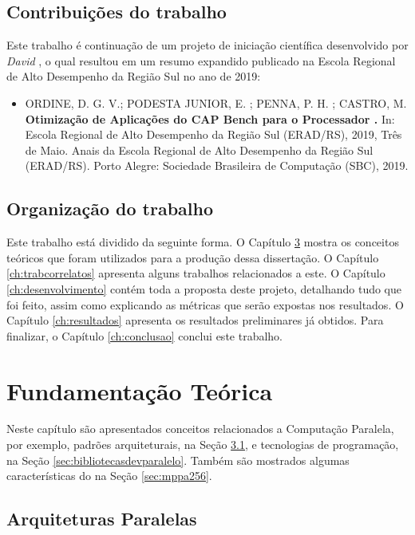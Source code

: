 \section{Contribuições do trabalho}

Este trabalho é continuação de um projeto de iniciação científica desenvolvido por \textit{David} \etal, o qual resultou em um resumo expandido publicado na Escola Regional de Alto Desempenho da Região Sul no ano de 2019:

\begin{itemize}
  \item ORDINE, D. G. V.; PODESTA JUNIOR, E. ; PENNA, P. H. ; CASTRO, M. \textbf{Otimização de Aplicações do CAP Bench para o Processador \mppa.} In: Escola Regional de Alto Desempenho da Região Sul (ERAD/RS), 2019, Três de Maio. Anais da Escola Regional de Alto Desempenho da Região Sul (ERAD/RS). Porto Alegre: Sociedade Brasileira de Computação (SBC), 2019.
\end{itemize}

\section{Organização do trabalho}

Este trabalho está dividido da seguinte forma. O Capítulo \ref{ch:fundamentacaoteorica} mostra os conceitos teóricos que foram utilizados para a produção dessa dissertação. O Capítulo \ref{ch:trabcorrelatos} apresenta alguns trabalhos relacionados a este. O Capítulo \ref{ch:desenvolvimento} contém toda a proposta deste projeto, detalhando tudo que foi feito, assim como explicando as métricas que serão expostas nos resultados. O Capítulo \ref{ch:resultados} apresenta os resultados preliminares já obtidos. Para finalizar, o Capítulo \ref{ch:conclusao} conclui este trabalho.

\chapter{Fundamentação Teórica}
\label{ch:fundamentacaoteorica}

Neste capítulo são apresentados conceitos relacionados a Computação Paralela, por exemplo, padrões arquiteturais, na Seção \ref{sec:arquiteturasparalelas}, e tecnologias de programação, na Seção \ref{sec:bibliotecasdevparalelo}. Também são mostrados algumas características do \mppa na Seção \ref{sec:mppa256}.

\section{Arquiteturas Paralelas}
\label{sec:arquiteturasparalelas}

